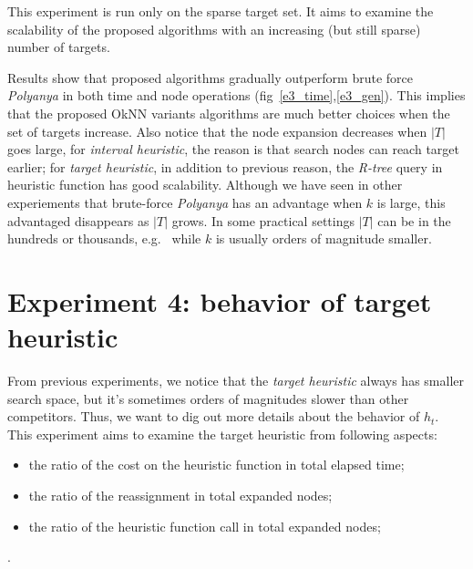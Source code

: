 This experiment is run only on the sparse target set. It aims to examine the scalability of the proposed algorithms with an increasing
(but still sparse) number of targets.

Results show that proposed algorithms gradually outperform brute force \textit{Polyanya} in both time and node operations (fig~\ref{e3_time},\ref{e3_gen}).
This implies that the proposed OkNN variants algorithms are much better choices when the set of targets increase. 
Also notice that the node expansion decreases when $|T|$ goes large,
for \textit{interval heuristic}, the reason is that search nodes can reach target earlier; for
\textit{target heuristic}, in addition to previous reason, the \textit{R-tree} query in
heuristic function has good scalability. 
Although we have seen in other experiements that brute-force \textit{Polyanya} has an advantage when $k$ is large, this advantaged disappears as $|T|$ grows.
In some practical settings $|T|$ can be in the hundreds or thousands, e.g.~\cite{abeywickrama2016k} while $k$ is usually orders of magnitude smaller. 

\section{Experiment 4: behavior of target heuristic}\label{exp4}
From previous experiments, we notice that the \textit{target heuristic} always has smaller search space,
but it's sometimes orders of magnitudes slower than other competitors.
Thus, we want to dig out more details about the behavior of $h_t$.
This experiment aims to examine the target heuristic from following aspects:
\begin{itemize}
  \item the ratio of the cost on the heuristic function in total elapsed time;
  \item the ratio of the reassignment in total expanded nodes;
  \item the ratio of the heuristic function call in total expanded nodes;
\end{itemize}.

